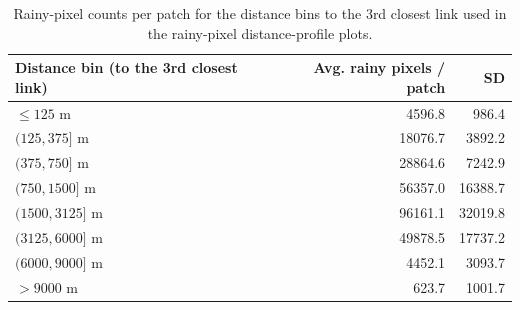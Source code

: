 \documentclass[11pt]{article}
\begin{document}
\begin{table}[H]
  \centering
  \begin{tabular}{lrr}
    \toprule
    Distance bin (to the 3rd closest link) & Avg. rainy pixels / patch & SD \\
    \midrule
    $\leq 125$ m & 4596.8 & 986.4 \\
    $(125,375]$ m & 18076.7 & 3892.2 \\
    $(375,750]$ m & 28864.6 & 7242.9 \\
    $(750,1500]$ m & 56357.0 & 16388.7 \\
    $(1500,3125]$ m & 96161.1 & 32019.8 \\
    $(3125,6000]$ m & 49878.5 & 17737.2 \\
    $(6000,9000]$ m & 4452.1 & 3093.7 \\
    $>9000$ m & 623.7 & 1001.7 \\
    \bottomrule
  \end{tabular}
  \caption{Rainy-pixel counts per patch for the distance bins to the 3rd closest link used in the rainy-pixel distance-profile plots.}
\end{table}
\end{document}
